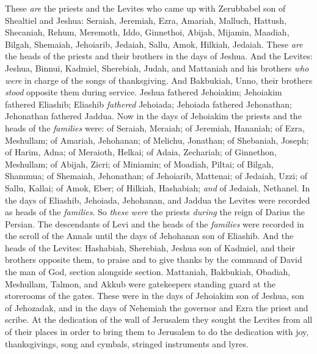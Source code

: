 \begin{biblechapter} %
 These \textit{are} the priests and the Levites who came up with Zerubbabel son of Shealtiel and Jeshua: Seraiah, Jeremiah, Ezra,
\verse Amariah, Malluch, Hattush,
\verse Shecaniah, Rehum, Meremoth,
\verse Iddo, Ginnethoi, Abijah,
\verse Mijamin, Maadiah, Bilgah,
\verse Shemaiah, Jehoiarib, Jedaiah,
\verse Sallu, Amok, Hilkiah, Jedaiah. These \textit{are} the heads of the priests and their brothers in the days of Jeshua.
\verse And the Levites: Jeshua, Binnui, Kadmiel, Sherebiah, Judah, and Mattaniah and his brothers \textit{who were} in charge of the songs of thanksgiving.
\verse And Bakbukiah, Unno, their brothers \textit{stood} opposite them during service.
\verse Jeshua fathered Jehoiakim; Jehoiakim fathered Eliashib; Eliashib \textit{fathered} Jehoiada;
\verse Jehoiada fathered Jehonathan; Jehonathan fathered Jaddua.
\verse Now in the days of Jehoiakim the priests and the heads of the \textit{families} were: of Seraiah, Meraiah; of Jeremiah, Hananiah;
\verse of Ezra, Meshullam; of Amariah, Jehohanan;
\verse of Melichu, Jonathan; of Shebaniah, Joseph;
\verse of Harim, Adna; of Meraioth, Helkai;
\verse of Adaia, Zechariah; of Ginnethon, Meshullam;
\verse of Abijah, Zicri; of Miniamin; of Moadiah, Piltai;
\verse of Bilgah, Shammua; of Shemaiah, Jehonathan;
\verse of Jehoiarib, Mattenai; of Jedaiah, Uzzi;
\verse of Sallu, Kallai; of Amok, Eber;
\verse of Hilkiah, Hashabiah; \textit{and} of Jedaiah, Nethanel.
\verse In the days of Eliashib, Jehoiada, Jehohanan, and Jaddua the Levites were recorded as heads of the \textit{families}. So \textit{these were} the priests \textit{during} the reign of Darius the Persian.
\verse The descendants of Levi and the heads of the \textit{families} were recorded in the scroll of the Annals until the days of Jehohanan son of Eliashib.
\verse And the heads of the Levites: Hashabiah, Sherebiah, Jeshua son of Kadmiel, and their brothers opposite them, to praise and to give thanks by the command of David the man of God, section alongside section.
\verse Mattaniah, Bakbukiah, Obadiah, Meshullam, Talmon, and Akkub were gatekeepers standing guard at the storerooms of the gates.
\verse These were in the days of Jehoiakim son of Jeshua, son of Jehozadak, and in the days of Nehemiah the governor and Ezra the priest and scribe.
 At the dedication of the wall of Jerusalem they sought the Levites from all of their places in order to bring them to Jerusalem to do the dedication with joy, thanksgivings, song and cymbals, stringed instruments and lyres.

\end{biblechapter}
